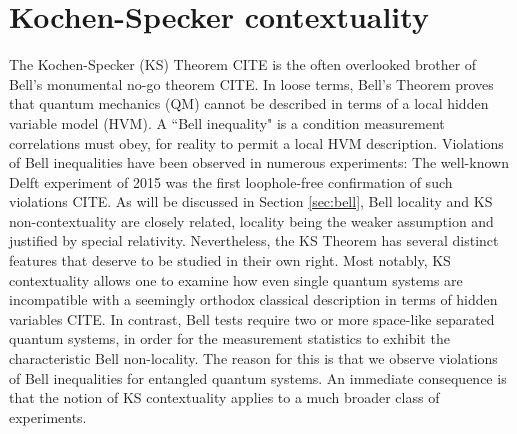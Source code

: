 \chapter{Kochen-Specker contextuality}
The Kochen-Specker (KS) Theorem CITE is the often overlooked brother of Bell's monumental no-go theorem CITE. In loose terms, Bell's Theorem proves that quantum mechanics (QM) cannot be described in terms of a local hidden variable model (HVM). A ``Bell inequality" is a condition measurement correlations must obey, for reality to permit a local HVM description. Violations of Bell inequalities have been observed in numerous experiments: The well-known Delft experiment of 2015 was the first loophole-free confirmation of such violations CITE. As will be discussed in Section \ref{sec:bell}, Bell locality and KS non-contextuality are closely related, locality being the weaker assumption and justified by special relativity. Nevertheless, the KS Theorem has several distinct features that deserve to be studied in their own right. Most notably, KS contextuality allows one to examine how even single quantum systems are incompatible with a seemingly orthodox classical description in terms of hidden variables CITE. In contrast, Bell tests require two or more space-like separated quantum systems, in order for the measurement statistics to exhibit the characteristic Bell non-locality. The reason for this is that we observe violations of Bell inequalities for entangled quantum systems. An immediate consequence is that the notion of KS contextuality applies to a much broader class of experiments. \cite{test}

